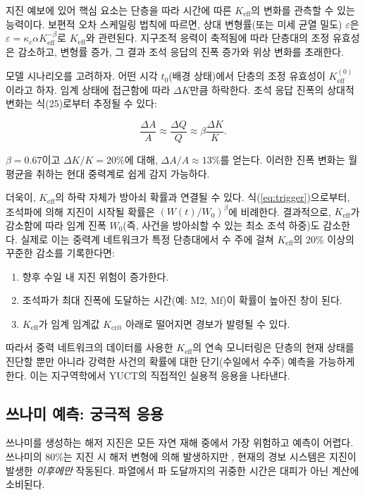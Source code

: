 \documentclass[12pt,a4paper]{article}
\theoremstyle{remark}
\begin{document}
	지진 예보에 있어 핵심 요소는 단층을 따라 시간에 따른 \(K_{\mathrm{eff}}\)의 변화를 관측할 수 있는 능력이다. 보편적 오차 스케일링 법칙에 따르면, 상대 변형률(또는 미세 균열 밀도) \(\varepsilon\)은 \(\varepsilon = \kappa_c \alpha K_{\mathrm{eff}}^{-\beta}\)로 \(K_{\mathrm{eff}}\)와 관련된다. 지구조적 응력이 축적됨에 따라 단층대의 조정 유효성은 감소하고, 변형률 증가, 그 결과 조석 응답의 진폭 증가와 위상 변화를 초래한다.
	
	모델 시나리오를 고려하자. 어떤 시각 \(t_0\)(배경 상태)에서 단층의 조정 유효성이 \(K_{\mathrm{eff}}^{(0)}\)이라고 하자. 임계 상태에 접근함에 따라 \(\Delta K\)만큼 하락한다. 조석 응답 진폭의 상대적 변화는 식(25)로부터 추정될 수 있다:
	
	\[
	\frac{\Delta A}{A} \approx \frac{\Delta Q}{Q} \approx \beta \frac{\Delta K}{K}.
	\]
	
	\(\beta = 0.67\)이고 \(\Delta K/K = 20\%\)에 대해, \(\Delta A/A \approx 13\%\)를 얻는다. 이러한 진폭 변화는 월 평균을 취하는 현대 중력계로 쉽게 감지 가능하다.
	
	더욱이, \(K_{\mathrm{eff}}\)의 하락 자체가 방아쇠 확률과 연결될 수 있다. 식(\ref{eq:trigger})으로부터, 조석파에 의해 지진이 시작될 확률은 \((W(t)/W_0)^{\beta}\)에 비례한다. 결과적으로, \(K_{\mathrm{eff}}\)가 감소함에 따라 임계 진폭 \(W_0\)(즉, 사건을 방아쇠할 수 있는 최소 조석 하중)도 감소한다. 실제로 이는 중력계 네트워크가 특정 단층대에서 수 주에 걸쳐 \(K_{\mathrm{eff}}\)의 20\% 이상의 꾸준한 감소를 기록한다면:
	
	\begin{enumerate}
		\item 향후 수일 내 지진 위험이 증가한다.
		\item 조석파가 최대 진폭에 도달하는 시간(예: M2, Mf)이 확률이 높아진 창이 된다.
		\item \(K_{\mathrm{eff}}\)가 임계 임계값 \(K_{\text{crit}}\) 아래로 떨어지면 경보가 발령될 수 있다.
	\end{enumerate}
	
	따라서 중력 네트워크의 데이터를 사용한 \(K_{\mathrm{eff}}\)의 연속 모니터링은 단층의 현재 상태를 진단할 뿐만 아니라 강력한 사건의 확률에 대한 단기(수일에서 수주) 예측을 가능하게 한다. 이는 지구역학에서 YUCT의 직접적인 실용적 응용을 나타낸다.
	
	\subsection{쓰나미 예측: 궁극적 응용}
	\label{sec:tsunami}
	
	쓰나미를 생성하는 해저 지진은 모든 자연 재해 중에서 가장 위험하고 예측이 어렵다. 쓰나미의 80\%는 지진 시 해저 변형에 의해 발생하지만 \cite{NOAA2024, USGS2024}, 현재의 경보 시스템은 지진이 발생한 \textit{이후에만} 작동된다. 파열에서 파 도달까지의 귀중한 시간은 대피가 아닌 계산에 소비된다.
	
\end{document}
